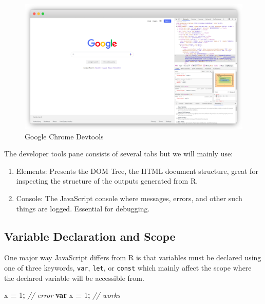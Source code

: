 \documentclass[
]{krantz}
\makeatletter
\newenvironment{Shaded}{\begin{snugshade}}{\end{snugshade}}
\newcommand{\CommentTok}[1]{\textcolor[rgb]{0.37,0.37,0.37}{\textit{#1}}}
\newcommand{\DecValTok}[1]{\textcolor[rgb]{0.06,0.06,0.06}{#1}}
\newcommand{\KeywordTok}[1]{\textcolor[rgb]{0.27,0.27,0.27}{\textbf{#1}}}
\newcommand{\NormalTok}[1]{#1}
\newcommand{\OperatorTok}[1]{\textcolor[rgb]{0.43,0.43,0.43}{\textbf{#1}}}
\providecommand{\tightlist}{%
  \setlength{\itemsep}{0pt}\setlength{\parskip}{0pt}}
\newenvironment{kframe}{%
\medskip{}
\setlength{\fboxsep}{.8em}
 \def\at@end@of@kframe{}%
 \ifinner\ifhmode%
  \def\at@end@of@kframe{\end{minipage}}%
  \begin{minipage}{\columnwidth}%
 \fi\fi%
 \def\FrameCommand##1{\hskip\@totalleftmargin \hskip-\fboxsep
 \colorbox{shadecolor}{##1}\hskip-\fboxsep
     \hskip-\linewidth \hskip-\@totalleftmargin \hskip\columnwidth}%
 \MakeFramed {\advance\hsize-\width
   \@totalleftmargin\z@ \linewidth\hsize
   \@setminipage}}%
 {\par\unskip\endMakeFramed%
 \at@end@of@kframe}
\renewenvironment{Shaded}{\begin{kframe}}{\end{kframe}}
\makeatother
\begin{document}
\begin{figure}
\centering
\includegraphics{images/devtools.png}
\caption{Google Chrome Devtools}
\end{figure}

The developer tools pane consists of several tabs but we will mainly use:

\begin{enumerate}
\def\labelenumi{\arabic{enumi}.}
\tightlist
\item
  Elements: Presents the DOM Tree, the HTML document structure, great for inspecting the structure of the outputs generated from R.
\item
  Console: The JavaScript console where messages, errors, and other such things are logged. Essential for debugging.
\end{enumerate}

\hypertarget{basics-var-scope}{%
\subsection{Variable Declaration and Scope}\label{basics-var-scope}}

One major way JavaScript differs from R is that variables must be declared using one of three keywords, \texttt{var}, \texttt{let}, or \texttt{const} which mainly affect the scope where the declared variable will be accessible from.

\begin{Shaded}
\begin{Highlighting}[]
\NormalTok{x }\OperatorTok{=} \DecValTok{1}\OperatorTok{;} \CommentTok{// error}
\KeywordTok{var}\NormalTok{ x }\OperatorTok{=} \DecValTok{1}\OperatorTok{;} \CommentTok{// works}
\end{Highlighting}
\end{Shaded}
\end{document}
